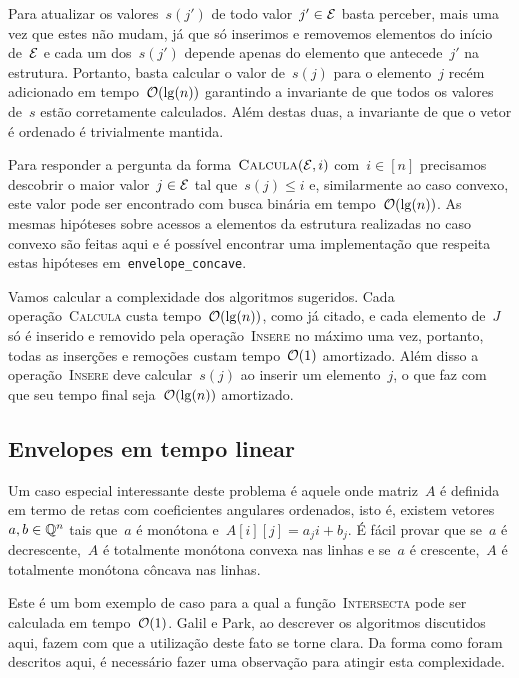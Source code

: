 Para atualizar os valores~$s(j')$ de todo valor~$j' \in \mathcal{E}$ basta perceber, mais uma vez que estes não mudam, já que só inserimos e removemos elementos do início de~$\mathcal{E}$ e cada um dos~$s(j')$ depende apenas do elemento que antecede~$j'$ na estrutura. Portanto, basta calcular o valor de~$s(j)$ para o elemento~$j$ recém adicionado em tempo~$\mathcal{O}(\lg(n))$ garantindo a invariante de que todos os valores de~$s$ estão corretamente calculados. Além destas duas, a invariante de que o vetor é ordenado é trivialmente mantida.

Para responder a pergunta da forma~${ \textsc{Calcula}(\mathcal{E},i) }$ com~$i \in [n]$ precisamos descobrir o maior valor~$j \in \mathcal{E}$ tal que~$s(j) \leq i$ e, similarmente ao caso convexo, este valor pode ser encontrado com busca binária em tempo~$\mathcal{O}(\lg(n))$. As mesmas hipóteses sobre acessos a elementos da estrutura realizadas no caso convexo são feitas aqui e é possível encontrar uma implementação que respeita estas hipóteses em~\texttt{envelope\_concave}. 

Vamos calcular a complexidade dos algoritmos sugeridos. Cada operação~\textsc{Calcula} custa tempo~$\mathcal{O}(\lg(n))$, como já citado, e cada elemento de~$J$ só é inserido e removido pela operação~\textsc{Insere} no máximo uma vez, portanto, todas as inserções e remoções custam tempo~$\mathcal{O}(1)$ amortizado. Além disso a operação~\textsc{Insere} deve calcular~$s(j)$ ao inserir um elemento~$j$, o que faz com que seu tempo final seja~$\mathcal{O}(\lg(n))$ amortizado.


\subsection{Envelopes em tempo linear} \label{Online:linear}

Um caso especial interessante deste problema é aquele onde matriz~$A$ é definida em termo de retas com coeficientes angulares ordenados, isto é, existem vetores~$a,b \in \mathbb{Q}^n$ tais que~$a$ é monótona e~$A[i][j] = a_j i + b_j$. É fácil provar que se~$a$ é decrescente,~$A$ é totalmente monótona convexa nas linhas e se~$a$ é crescente,~$A$ é totalmente monótona côncava nas linhas.

Este é um bom exemplo de caso para a qual a função~\textsc{Intersecta} pode ser calculada em tempo~$\mathcal{O}(1)$. Galil e Park, ao descrever os algoritmos discutidos aqui, fazem com que a utilização deste fato se torne clara. Da forma como foram descritos aqui, é necessário fazer uma observação para atingir esta complexidade.

